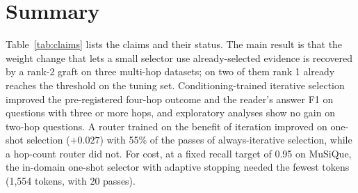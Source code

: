 \section{Summary}
\label{sec:res_summary}

Table~\ref{tab:claims} lists the claims and their status. The main result is that the weight change that lets a small selector use already-selected evidence is recovered by a rank-2 graft on three multi-hop datasets; on two of them rank 1 already reaches the threshold on the tuning set. Conditioning-trained iterative selection improved the pre-registered four-hop outcome and the reader's answer F1 on questions with three or more hops, and exploratory analyses show no gain on two-hop questions. A router trained on the benefit of iteration improved on one-shot selection ($+0.027$) with 55\% of the passes of always-iterative selection, while a hop-count router did not. For cost, at a fixed recall target of 0.95 on MuSiQue, the in-domain one-shot selector with adaptive stopping needed the fewest tokens (1,554 tokens, with 20 passes).

